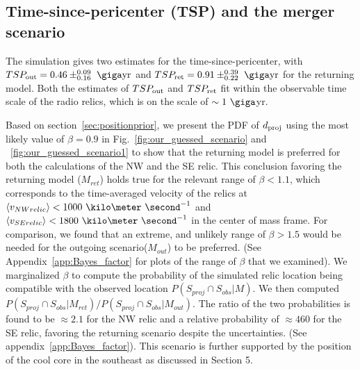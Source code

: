 \documentclass[letterpaper,useAMS,usenatbib]{mn2e}
\begin{document}
\subsection{Time-since-pericenter (TSP) and the merger scenario}
\label{sec:merger_scenario}
The simulation gives two estimates for
the time-since-pericenter, with $TSP_{\rm out} = 0.46\pm^{0.09}_{0.16}~\giga \text{yr}$
and $TSP_{\rm ret} =0.91\pm^{0.39}_{0.22}~\giga\text{yr}$ for the returning model. Both the estimates of
$TSP_{\rm out}$ and $TSP_{\rm ret}$ 
fit within the observable time scale of the radio
relics, which is on the scale of $\sim1~\giga$yr.\par 
Based on section~\ref{sec:positionprior}, we present the PDF of
$d_{\rm proj}$ using the most likely
value of $\beta = 0.9$ in Fig.~\ref{fig:our_guessed_scenario} and
~\ref{fig:our_guessed_scenario1} to show that
the returning model is preferred for both the calculations of the NW and the
SE relic. This conclusion favoring the returning model ($M_{ret}$) holds true for the
relevant range of $  \beta
< 1.1$, which corresponds to the time-averaged velocity of the relics at
$\langle v_{NW relic} \rangle < 1000~\kilo\meter~\second^{-1}$ and $\langle
v_{SE relic} \rangle < 1800~\kilo\meter~\second^{-1}$ in the center of
mass frame. For comparison, we found that an extreme, and unlikely
range of $\beta > 1.5$ would be needed for the outgoing scenario($M_{out}$) to be
preferred. (See Appendix~\ref{app:Bayes_factor} for plots of the range
of $\beta$ that we examined). We marginalized $\beta$ to compute the
probability of the simulated relic location being compatible with the
observed location $P(S_{proj} \cap S_{obs}| M)$. We then computed   
$P(S_{proj} \cap S_{obs} | M_{ret}) / P(S_{proj} \cap S_{obs} | M_{out})$. 
The ratio of the two probabilities is found to be $\approx
2.1$ for the NW relic and a relative probability of $\approx 460$ for the
SE relic, favoring the returning scenario despite the
uncertainties. (See appendix~\ref{app:Bayes_factor}). This scenario is
further supported by the position of the cool core in the southeast as
discussed in Section 5.  
\end{document}
